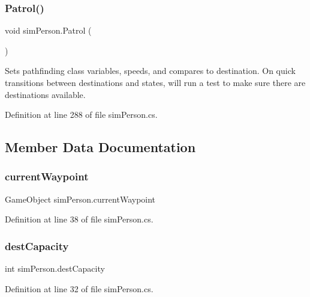 \subsubsection{\texorpdfstring{Patrol()}{Patrol()}}
{\footnotesize\ttfamily void sim\+Person.\+Patrol (\begin{DoxyParamCaption}{ }\end{DoxyParamCaption})}

Sets pathfinding class variables, speeds, and compares to destination. On quick transitions between destinations and states, will run a test to make sure there are destinations available. 

Definition at line 288 of file sim\+Person.\+cs.



\subsection{Member Data Documentation}
\hypertarget{classsim_person_a47b2bb1a902576614f65b7ecf1fa1bdd}{}\label{classsim_person_a47b2bb1a902576614f65b7ecf1fa1bdd} 
\subsubsection{\texorpdfstring{current\+Waypoint}{currentWaypoint}}
{\footnotesize\ttfamily Game\+Object sim\+Person.\+current\+Waypoint}



Definition at line 38 of file sim\+Person.\+cs.

\hypertarget{classsim_person_ac816cec7286f37dc4f4fa30d5c5d909c}{}\label{classsim_person_ac816cec7286f37dc4f4fa30d5c5d909c} 
\subsubsection{\texorpdfstring{dest\+Capacity}{destCapacity}}
{\footnotesize\ttfamily int sim\+Person.\+dest\+Capacity}



Definition at line 32 of file sim\+Person.\+cs.

\hypertarget{classsim_person_a1459d9a83816086b302d5fb609855ed7}{}\label{classsim_person_a1459d9a83816086b302d5fb609855ed7} 
